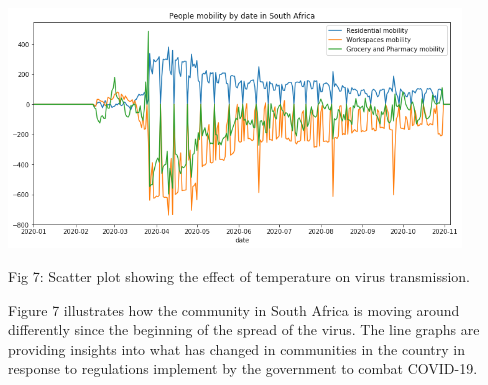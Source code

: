 \documentclass[12pt]{article}
\begin{document}
\centering
\includegraphics[width=0.9\textwidth, inner]{mobility.png}
\caption{Fig 7: Scatter plot showing the effect of temperature on virus transmission.}

Figure 7 illustrates how the community in South Africa is moving around differently since the beginning of the spread of the virus. The line graphs are providing insights into what has changed in communities in the country in response to regulations implement by the government to combat COVID-19. 
\end{document}

